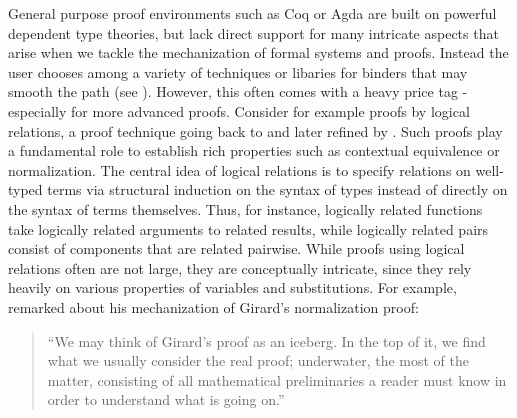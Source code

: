 General purpose proof environments such as Coq \citep{bertot/casteran:2004} or Agda \citep{Norell:phd07} are built on
powerful dependent type theories, but lack direct support for many
intricate aspects that arise when we tackle the mechanization of
formal systems and proofs. Instead the user chooses among a variety of
techniques or libaries for binders that may smooth the path (see
\cite{Aydemir:TechReport09}). However, this often comes with a heavy
price tag - especially for more advanced proofs.  Consider for example proofs
by logical relations, a proof technique going back to 
\cite{Tait67} and later refined by 
\cite{GirardLafontTaylor:proofsAndTypes}.  Such proofs play a
fundamental role to establish rich properties such as contextual
equivalence or normalization.  The central idea of logical relations is to specify relations on well-typed terms via structural induction on the syntax of types instead of directly on the syntax of terms themselves. Thus, for instance, logically related functions take logically related arguments to related results, while  logically related pairs consist of components that are related pairwise.  While proofs using logical relations often are not large, they are conceptually intricate, since they rely heavily on various properties of variables and substitutions.
%
%
For example,  \cite{Berardi:WLF90} remarked about his mechanization of Girard's normalization proof:
\begin{quote}
``We may think of Girard's proof as an iceberg. In the top of it, we find what we usually consider the real proof; underwater, the most  of the matter, consisting of all mathematical preliminaries a reader must know in order to understand what is going on.''
\end{quote}


